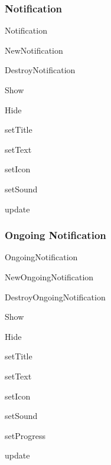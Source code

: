 \subsubsection*{Notification}


\begin{DoxyItemize}
\item Notification
\begin{DoxyItemize}
\item New\-Notification
\item Destroy\-Notification
\item Show
\item Hide
\item set\-Title
\item set\-Text
\item set\-Icon
\item set\-Sound
\item update
\end{DoxyItemize}
\end{DoxyItemize}

\subsubsection*{Ongoing Notification}


\begin{DoxyItemize}
\item Ongoing\-Notification
\begin{DoxyItemize}
\item New\-Ongoing\-Notification
\item Destroy\-Ongoing\-Notification
\item Show
\item Hide
\item set\-Title
\item set\-Text
\item set\-Icon
\item set\-Sound
\item set\-Progress
\item update 
\end{DoxyItemize}
\end{DoxyItemize}